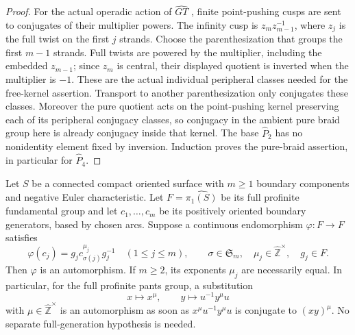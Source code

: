 \begin{proof}
For the actual operadic action of $\widehat{GT}$
\cite[Sections 7 and 11]{CEBHR2019}, finite
point-pushing cusps are sent to conjugates of their
multiplier powers.  The infinity cusp is
$z_m z_{m-1}^{-1}$, where $z_j$ is the full twist on
the first $j$ strands.  Choose the parenthesization that
groups the first $m-1$ strands.  Full twists are powered
by the multiplier, including the embedded $z_{m-1}$;
since $z_m$ is central, their displayed quotient is
inverted when the multiplier is $-1$.  These are the
actual individual peripheral classes needed for the
free-kernel assertion.  Transport to another
parenthesization only conjugates these classes.
Moreover the pure quotient acts on the point-pushing
kernel preserving each of its peripheral conjugacy
classes, so conjugacy in the ambient pure braid group
here is already conjugacy inside that kernel.
The base
$\widehat P_2$ has no nonidentity element fixed by
inversion.  Induction proves the pure-braid assertion,
in particular for $\widehat P_4$.
\end{proof}

Let $S$ be a connected compact oriented surface with $m\geq1$ boundary components and negative Euler characteristic. Let $F=\widehat{\pi_1(S)}$ be its full profinite fundamental group and let $c_1,\ldots,c_m$ be its positively oriented boundary generators, based by chosen arcs. Suppose a continuous endomorphism $\varphi:F\to F$ satisfies
\[
 \varphi(c_j)=g_jc_{\sigma(j)}^{\mu_j}g_j^{-1}
 \quad(1\leq j\leq m),
 \qquad \sigma\in\mathfrak S_m,\quad
 \mu_j\in\widehat{\mathbb Z}^{\times},\quad g_j\in F.
\]
Then $\varphi$ is an automorphism. If $m\geq2$, its exponents $\mu_j$ are necessarily equal. In particular, for the full profinite pants group, a substitution
\[
 x\longmapsto x^\mu,\qquad y\longmapsto u^{-1}y^\mu u
\]
with $\mu\in\widehat{\mathbb Z}^{\times}$ is an automorphism as soon as $x^\mu u^{-1}y^\mu u$ is conjugate to $(xy)^\mu$. No separate full-generation hypothesis is needed.


